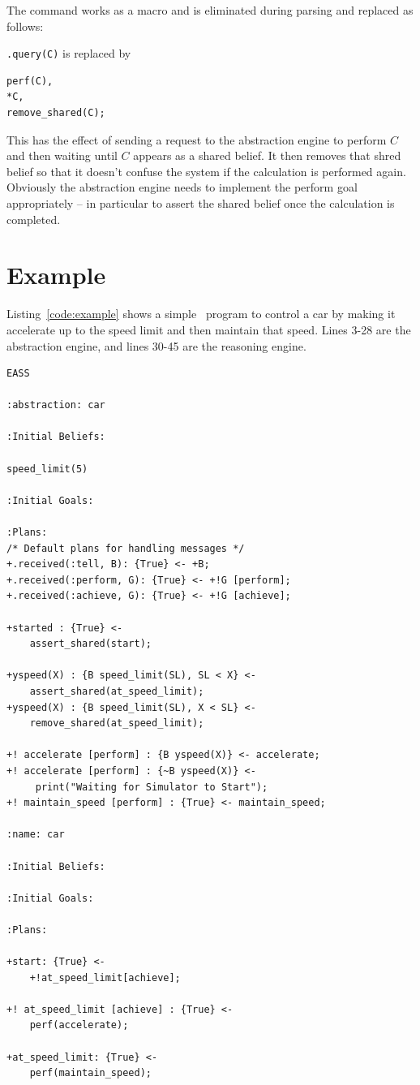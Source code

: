 \documentclass[a4]{article}
\begin{document}
The command works as a macro and is eliminated during parsing and replaced as follows:

\texttt{.query(C)} is replaced by
\begin{verbatim}
perf(C),
*C,
remove_shared(C);
\end{verbatim}
This has the effect of sending a request to the abstraction engine to perform $C$ and then waiting until $C$ appears as a shared belief.  It then removes that shred belief so that it doesn't confuse the system if the calculation is performed again.  Obviously the abstraction engine needs to implement the perform goal appropriately -- in particular to assert the shared belief once the calculation is completed.

\section{Example}
Listing~\ref{code:example} shows a simple \eass\ program to control a car by making it accelerate up to the speed limit and then maintain that speed.  Lines 3-28 are the abstraction engine, and lines 30-45 are the reasoning engine.

\begin{lstlisting}[float,caption=A Simple EASS Program,basicstyle=\sffamily,style=easslisting,language=Gwendolen,label=code:example]
EASS

:abstraction: car

:Initial Beliefs:

speed_limit(5)
											
:Initial Goals:
		
:Plans: 
/* Default plans for handling messages */
+.received(:tell, B): {True} <- +B;   
+.received(:perform, G): {True} <- +!G [perform];
+.received(:achieve, G): {True} <- +!G [achieve];

+started : {True} <-
	assert_shared(start);

+yspeed(X) : {B speed_limit(SL), SL < X} <-
	assert_shared(at_speed_limit);
+yspeed(X) : {B speed_limit(SL), X < SL} <-
	remove_shared(at_speed_limit);
	
+! accelerate [perform] : {B yspeed(X)} <- accelerate;
+! accelerate [perform] : {~B yspeed(X)} <- 
     print("Waiting for Simulator to Start");
+! maintain_speed [perform] : {True} <- maintain_speed;

:name: car
			
:Initial Beliefs:
													
:Initial Goals:
		
:Plans: 

+start: {True} <-
	+!at_speed_limit[achieve];

+! at_speed_limit [achieve] : {True} <-
	perf(accelerate);

+at_speed_limit: {True} <-
	perf(maintain_speed);
\end{lstlisting}
\end{document}
